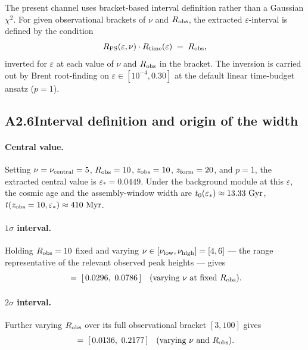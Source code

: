 The present channel uses bracket-based interval definition rather
than a Gaussian $\chi^2$. For given observational brackets of
$\nu$ and $R_{\rm obs}$, the extracted $\varepsilon$-interval is
defined by the condition
\begin{equation}
R_{\rm PS}(\varepsilon, \nu) \cdot R_{\rm time}(\varepsilon)
\;=\; R_{\rm obs},
\label{eq:jwst_condition}
\end{equation}
inverted for $\varepsilon$ at each value of $\nu$ and $R_{\rm obs}$
in the bracket. The inversion is carried out by Brent root-finding
on $\varepsilon \in [10^{-4}, 0.30]$ at the default linear
time-budget ansatz ($p = 1$).

\subsection*{A2.6\quad Interval definition and origin of the width}

\paragraph{Central value.} Setting
$\nu = \nu_{\rm central} = 5$, $R_{\rm obs} = 10$,
$z_{\rm obs} = 10$, $z_{\rm form} = 20$, and $p = 1$, the
extracted central value is $\varepsilon_* = 0.0449$. Under the
background module at this $\varepsilon$, the cosmic age and the
assembly-window width are
$t_0(\varepsilon_*) \approx 13.33~{\rm Gyr}$,
$t(z_{\rm obs} = 10, \varepsilon_*) \approx 410~{\rm Myr}$.

\paragraph{$1\sigma$ interval.} Holding $R_{\rm obs} = 10$ fixed
and varying $\nu \in [\nu_{\rm low}, \nu_{\rm high}] = [4, 6]$
--- the range representative of the relevant observed peak
heights --- gives
\begin{equation}
[\varepsilon_{\rm lo}^{1\sigma},\,\varepsilon_{\rm hi}^{1\sigma}]
\;=\;
[\,0.0296,\ 0.0786\,]
\quad (\text{varying } \nu\text{ at fixed } R_{\rm obs}).
\label{eq:eps_jwst_1sigma}
\end{equation}

\paragraph{$2\sigma$ interval.} Further varying $R_{\rm obs}$ over
its full observational bracket $[3, 100]$ gives
\begin{equation}
[\varepsilon_{\rm lo}^{2\sigma},\,\varepsilon_{\rm hi}^{2\sigma}]
\;=\;
[\,0.0136,\ 0.2177\,]
\quad (\text{varying }\nu\text{ and }R_{\rm obs}).
\label{eq:eps_jwst_2sigma}
\end{equation}

